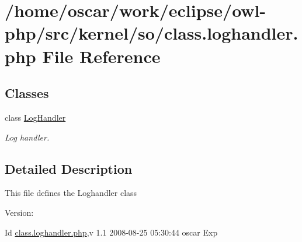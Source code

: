 \hypertarget{class_8loghandler_8php}{
\section{/home/oscar/work/eclipse/owl-php/src/kernel/so/class.loghandler.php File Reference}
\label{class_8loghandler_8php}
}
\subsection*{Classes}
\begin{CompactItemize}
\item 
class \hyperlink{classLogHandler}{LogHandler}
\begin{CompactList}\small\item\em Log handler. \item\end{CompactList}\end{CompactItemize}


\subsection{Detailed Description}
This file defines the Loghandler class \begin{Desc}
\item[Version:]\end{Desc}
\begin{Desc}
\item[Id]\hyperlink{class_8loghandler_8php}{class.loghandler.php},v 1.1 2008-08-25 05:30:44 oscar Exp \end{Desc}
